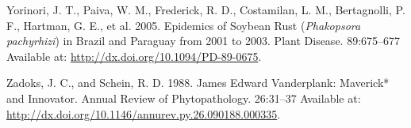 \documentclass[
  letterpaper,
]{book}
\newlength{\cslhangindent}
\newlength{\cslentryspacingunit} %
\newenvironment{CSLReferences}[2] %
 {%
  \setlength{\parindent}{0pt}
  \ifodd #1
  \let\oldpar\par
  \def\par{\hangindent=\cslhangindent\oldpar}
  \fi
  \setlength{\parskip}{#2\cslentryspacingunit}
 }%
 {}
\begin{document}
\begin{CSLReferences}{0}{0}
\leavevmode{}%
Yorinori, J. T., Paiva, W. M., Frederick, R. D., Costamilan, L. M.,
Bertagnolli, P. F., Hartman, G. E., et al. 2005. Epidemics of Soybean
Rust ({\emph{Phakopsora pachyrhizi}}) in Brazil and Paraguay from 2001
to 2003. Plant Disease. 89:675--677 Available at:
\url{http://dx.doi.org/10.1094/PD-89-0675}.

\leavevmode{}%
Zadoks, J. C., and Schein, R. D. 1988. James Edward Vanderplank:
Maverick* and Innovator. Annual Review of Phytopathology. 26:31--37
Available at:
\url{http://dx.doi.org/10.1146/annurev.py.26.090188.000335}.

\end{CSLReferences}


\backmatter
\end{document}
